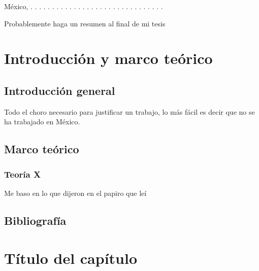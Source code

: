 \documentclass[12pt,twoside]{reedthesis}
\begin{document}
México, 
\vspace{3cm}
. . . . . . . . . . . . . . . . . . . . . . . . . . . . . . .


  \begin{resumen}
    Probablemente haga un resumen al final de mi tesis
  \end{resumen}


  \setcounter{tocdepth}{2}
  \tableofcontents

  \listoftables

  \listoffigures

\mainmatter %
\pagestyle{fancyplain} %

\hypertarget{introducciuxf3n-y-marco-teuxf3rico}{%
\chapter{Introducción y marco teórico}\label{introducciuxf3n-y-marco-teuxf3rico}}

\hypertarget{introducciuxf3n-general}{%
\section{Introducción general}\label{introducciuxf3n-general}}

Todo el choro necesario para justificar un trabajo, lo más fácil es decir que no se ha trabajado en México.

\hypertarget{marco-teuxf3rico}{%
\section{Marco teórico}\label{marco-teuxf3rico}}

\hypertarget{teoruxeda-x}{%
\subsection{Teoría X}\label{teoruxeda-x}}

Me baso en lo que dijeron en el papiro que leí

\hypertarget{bibliografuxeda}{%
\section{Bibliografía}\label{bibliografuxeda}}

\hypertarget{refs}{}

\hypertarget{tuxedtulo-del-capuxedtulo}{%
\chapter{Título del capítulo}\label{tuxedtulo-del-capuxedtulo}}
\end{document}
